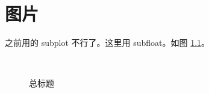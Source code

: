 
\chapter{图片}
\label{cha:5}

之前用的 subplot 不行了。这里用 subfloat。如图 \ref{fig:example}。

\begin{figure}
\centering
{}
\\
\hfill
{}
\caption{总标题}
\label{fig:example}
\end{figure}



